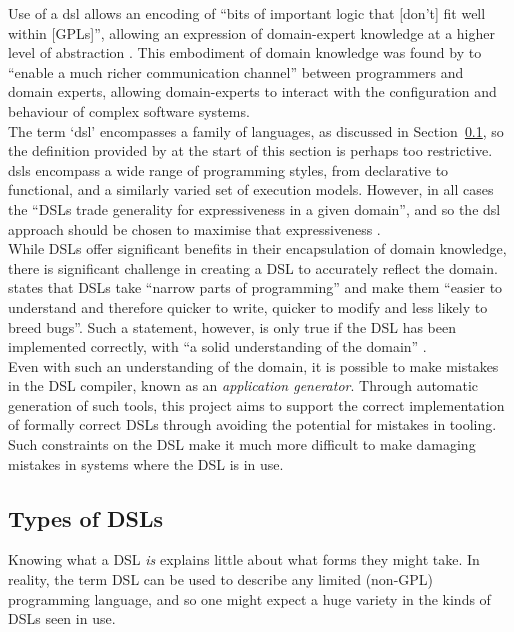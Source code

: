 Use of a \gls{dsl} allows an encoding of ``bits of important logic that [don't] fit well within [GPLs]'', allowing an expression of domain-expert knowledge at a higher level of abstraction \citep{fowler2010domain,van2000domain}. 
This embodiment of domain knowledge was found by \citet{fowler2010domain} to ``enable a much richer communication channel'' between programmers and domain experts, allowing domain-experts to interact with the configuration and behaviour of complex software systems. \\

The term `\gls{dsl}' encompasses a family of languages, as discussed in Section~\ref{sub:types_of_dsls}, so the definition provided by \citet{van2000domain} at the start of this section is perhaps too restrictive. 
\glspl{dsl} encompass a wide range of programming styles, from declarative to functional, and a similarly varied set of execution models. 
However, in all cases the ``DSLs trade generality for expressiveness in a given domain'', and so the \gls{dsl} approach should be chosen to maximise that expressiveness \citep{Mernik:2005:DDL:1118890.1118892}. \\

While DSLs offer significant benefits in their encapsulation of domain knowledge, there is significant challenge in creating a DSL to accurately reflect the domain. 
\citet{fowler2010domain} states that DSLs take ``narrow parts of programming'' and make them ``easier to understand and therefore quicker to write, quicker to modify and less likely to breed bugs''. 
Such a statement, however, is only true if the DSL has been implemented correctly, with ``a solid understanding of the domain'' \citep[pg. 1]{bosch1997domain}.\\

Even with such an understanding of the domain, it is possible to make mistakes in the DSL compiler, known as an \textit{application generator}.
Through automatic generation of such tools, this project aims to support the correct implementation of formally correct DSLs through avoiding the potential for mistakes in tooling. 
Such constraints on the DSL make it much more difficult to make damaging mistakes in systems where the DSL is in use. 

\subsection{Types of DSLs} %
\label{sub:types_of_dsls}
Knowing what a DSL \textit{is} explains little about what forms they might take. 
In reality, the term DSL can be used to describe any limited (non-GPL) programming language, and so one might expect a huge variety in the kinds of DSLs seen in use. \\

